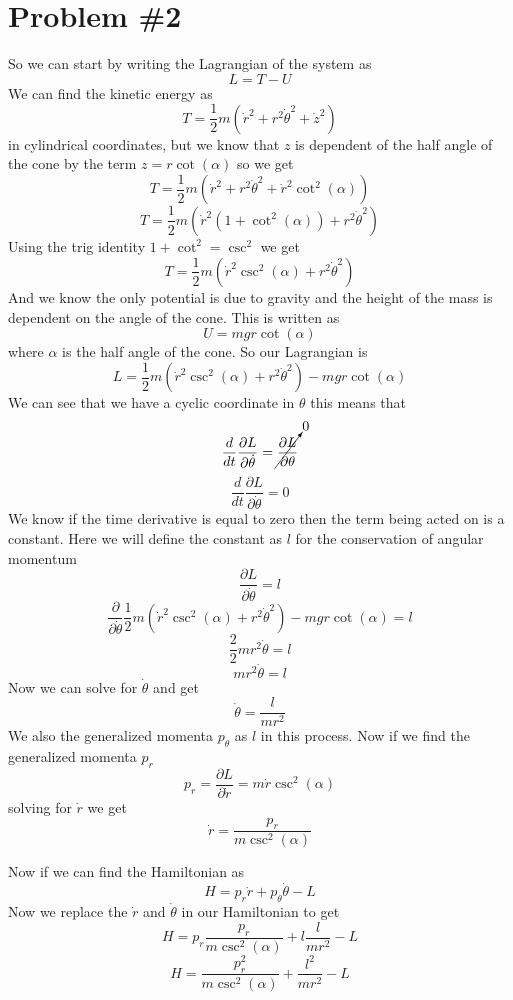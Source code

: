 \documentclass[11pt]{article}
\numberwithin{equation}{section}
\begin{document}
\section{Problem \#2}
So we can start by writing the Lagrangian of the system as
$$L= T - U$$
We can find the kinetic energy as
$$T = \frac{1}{2}m(\dot{r}^2 + r^2\dot{\theta}^2 +\dot{z}^2)$$
in cylindrical coordinates, but we know that $z$ is dependent of the half angle of the cone by the term $z=r\cot(\alpha)$ so we get
$$T = \frac{1}{2}m(\dot{r}^2 + r^2\dot{\theta}^2 +\dot{r}^2\cot^2(\alpha))$$
$$T = \frac{1}{2}m(\dot{r}^2(1+\cot^2(\alpha)) + r^2\dot{\theta}^2)$$
Using the trig identity $1+\cot^2 = \csc^2$ we get
$$T = \frac{1}{2}m(\dot{r}^2\csc^2(\alpha) + r^2\dot{\theta}^2)$$
And we know the only potential is due to gravity and the height of the mass is dependent on the angle of the cone. This is written as
$$U = mgr\cot(\alpha)$$
where $\alpha$ is the half angle of the cone. So our Lagrangian is 
$$L = \frac{1}{2}m(\dot{r}^2\csc^2(\alpha) + r^2\dot{\theta}^2) - mgr\cot(\alpha)$$
We can see that we have a cyclic coordinate in $\theta$ this means that
$$\frac{d}{dt}\frac{\partial L}{\partial \dot{\theta}} = \cancelto{0}{\frac{\partial L}{\partial {\theta}}}$$
$$\frac{d}{dt}\frac{\partial L}{\partial \dot{\theta}} = 0$$
We know if the time derivative is equal to zero then the term being acted on is a constant. Here we will define the constant as $l$ for the conservation of angular momentum 
$$\frac{\partial L}{\partial \dot{\theta}} = l$$
$$\frac{\partial }{\partial \dot{\theta}} \frac{1}{2}m(\dot{r}^2\csc^2(\alpha)  + r^2\dot{\theta}^2) - mgr\cot(\alpha)= l$$
$$\frac{2}{2}mr^2\dot{\theta} = l$$
$$mr^2\dot{\theta} = l$$
Now we can solve for $\dot{\theta}$ and get
$$\dot{\theta} = \frac{l}{mr^2}$$
We also the generalized momenta $p_{\theta}$ as $l$ in this process. Now if we find the generalized momenta $p_r$
$$p_r = \frac{\partial L}{\partial \dot{r}} = m\dot{r}\csc^2(\alpha)$$
solving for $\dot{r}$ we get
$$\dot{r}= \frac{p_r}{m\csc^2(\alpha)}$$

Now if we can find the Hamiltonian as
$$H = p_r\dot{r} + p_{\theta}\dot{\theta} - L$$
Now we replace the $\dot{r}$ and $\dot{\theta}$ in our Hamiltonian to get
$$H = p_r \frac{p_r}{m\csc^2(\alpha)}+ l\frac{l}{mr^2} - L$$
$$H = \frac{p_r^2}{m\csc^2(\alpha)}+ \frac{l^2}{mr^2} - L$$
\end{document}
